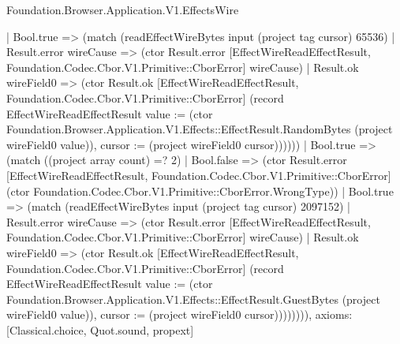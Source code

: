 \begin{lexlean}{Foundation.Browser.Application.V1.EffectsWire}
\begin{semanticmodule}
{            | Bool.true => (match (readEffectWireBytes input (project tag cursor) 65536)
              | Result.error wireCause => (ctor Result.error [EffectWireReadEffectResult, Foundation.Codec.Cbor.V1.Primitive::CborError] wireCause)
              | Result.ok wireField0 => (ctor Result.ok [EffectWireReadEffectResult, Foundation.Codec.Cbor.V1.Primitive::CborError] (record EffectWireReadEffectResult {value := (ctor Foundation.Browser.Application.V1.Effects::EffectResult.RandomBytes (project wireField0 value)), cursor := (project wireField0 cursor)})))))
        | Bool.true => (match ((project array count) =? 2)
          | Bool.false => (ctor Result.error [EffectWireReadEffectResult, Foundation.Codec.Cbor.V1.Primitive::CborError] (ctor Foundation.Codec.Cbor.V1.Primitive::CborError.WrongType))
          | Bool.true => (match (readEffectWireBytes input (project tag cursor) 2097152)
            | Result.error wireCause => (ctor Result.error [EffectWireReadEffectResult, Foundation.Codec.Cbor.V1.Primitive::CborError] wireCause)
            | Result.ok wireField0 => (ctor Result.ok [EffectWireReadEffectResult, Foundation.Codec.Cbor.V1.Primitive::CborError] (record EffectWireReadEffectResult {value := (ctor Foundation.Browser.Application.V1.Effects::EffectResult.GuestBytes (project wireField0 value)), cursor := (project wireField0 cursor)}))))))),
  axioms: [Classical.choice, Quot.sound, propext]
}


\end{semanticmodule}
\end{lexlean}
